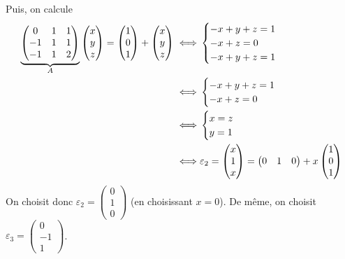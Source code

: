 \documentclass[a4paper]{article}
\begin{document}
\begin{enumerate}
			Puis, on calcule
			\begin{align*}
				\underbrace{\begin{pmatrix}
					0&1&1\\
					-1&1&1\\
					-1&1&2
				\end{pmatrix}}_{\smash{A}} \begin{pmatrix}
					x\\y\\z
				\end{pmatrix} = \begin{pmatrix}
					1\\0\\1
				\end{pmatrix} + \begin{pmatrix}
					x\\y\\z
				\end{pmatrix} \iff& \begin{cases}
					-x + y + z = 1\\
					-x+z=0\\
					-x + y +z = 1
				\end{cases}\\
				\iff& \begin{cases}
					-x+y+z=1\\
					-x+z = 0
				\end{cases}\\
				\iff& \begin{cases}
					x = z\\
					y = 1
				\end{cases}\\
				\iff& \varepsilon_2 = \begin{pmatrix}
					x\\1\\x
				\end{pmatrix} = \begin{pmatrix}
					0&1&0
				\end{pmatrix} + x \begin{pmatrix}
					1\\0\\1
				\end{pmatrix}
			\end{align*}
			On choisit donc $\varepsilon_2 = \left( \substack{0\\1\\0} \right)$\/ (en choisissant $x = 0$). De même, on choisit $\varepsilon_3 = \left( \substack{0\\-1\\1} \right)$.

\end{enumerate}
\end{document}
